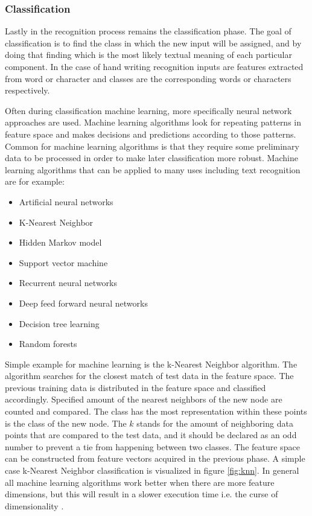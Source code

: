 \documentclass{article}
\begin{document}
      \subsubsection{Classification}
        Lastly in the recognition process remains the classification phase. The goal of classification is to find the class in which the new input will be assigned, and by doing that finding which is the most likely textual meaning of each particular component. In the case of hand writing recognition inputs are features extracted from word or character and classes are the corresponding words or characters respectively.

        Often during classification machine learning, more specifically neural network approaches are used. Machine learning algorithms look for repeating patterns in feature space and makes decisions and predictions according to those patterns. Common for machine learning algorithms is that they require some preliminary data to be processed in order to make later classification more robust. Machine learning algorithms that can be applied to many uses including text recognition are for example:

        \begin{itemize}
          \item Artificial neural networks
          \item K-Nearest Neighbor
          \item Hidden Markov model
          \item Support vector machine
          \item Recurrent neural networks
          \item Deep feed forward neural networks
          \item Decision tree learning
          \item Random forests  \cite{SAS}
        \end{itemize}

          Simple example for machine learning is the k-Nearest Neighbor algorithm. The algorithm searches for the closest match of test data in the feature space. The previous training data is distributed in the feature space and classified accordingly. Specified amount of the nearest neighbors of the new node are counted and compared. The class has the most representation within these points is the class of the new node. The $k$ stands for the amount of neighboring data points that are compared to the test data, and it should be declared as an odd number to prevent a tie from happening between two classes. The feature space can be constructed from feature vectors acquired in the previous phase. A simple case k-Nearest Neighbor classification is visualized in figure \ref{fig:knn}. In general all machine learning algorithms work better when there are more feature dimensions, but this will result in a slower execution time i.e. the curse of dimensionality \cite{Beyer}.
\end{document}
